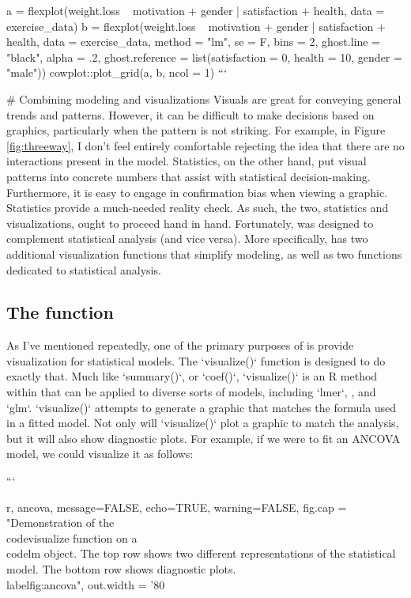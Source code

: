 {{{{{{{{{{{{a = flexplot(weight.loss ~ motivation + gender | satisfaction + health, 
    data = exercise_data) 
b = flexplot(weight.loss ~ motivation + gender | satisfaction + health, 
    data = exercise_data, 
    method = "lm", se = F, bins = 2, ghost.line = "black", alpha = .2,
    ghost.reference = list(satisfaction = 0, health = 10, gender = "male"))
cowplot::plot_grid(a, b, ncol = 1)
```


# Combining modeling and visualizations
Visuals are great for conveying general trends and patterns. However, it can be difficult to make decisions based on graphics, particularly when the pattern is not striking. For example, in Figure \ref{fig:threeway}, I don't feel entirely comfortable rejecting the idea that there are no interactions present in the model. Statistics, on the other hand, put visual patterns into concrete numbers that assist with statistical decision-making. Furthermore, it is easy to engage in confirmation bias when viewing a graphic. Statistics provide a much-needed reality check. As such, the two, statistics and visualizations, ought to proceed hand in hand. Fortunately,  was designed to complement statistical analysis (and vice versa). More specifically,  has two additional visualization functions that simplify modeling, as well as two functions dedicated to statistical analysis. 

\subsection[The visualize() function]{The  function} \label{sec:visualize}
As I've mentioned repeatedly, one of the primary purposes of  is provide visualization for statistical models. The `visualize()` function is designed to do exactly that. Much like `summary()`, or `coef()`, `visualize()` is an R method within  that can be applied to diverse sorts of models, including `lmer`, , and `glm`. `visualize()` attempts to generate a graphic that matches the formula used in a fitted model. Not only will `visualize()` plot a graphic to match the analysis, but it will also show diagnostic plots. For example, if we were to fit an ANCOVA model, we could visualize it as follows:

```{r, ancova, message=FALSE, echo=TRUE, warning=FALSE, fig.cap = "Demonstration of the \\code{visualize} function on a \\code{lm} object. The top row shows two different representations of the statistical model. The bottom row shows diagnostic plots.  \\label{fig:ancova}", out.width = '80%

}}}}}}}}}}}}}
